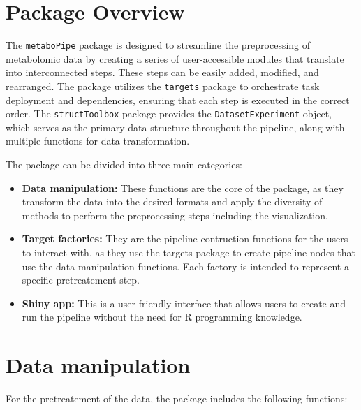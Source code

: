 \documentclass[ENG, BIB]{TFUOC}%
\begin{document}
\section{Package Overview}
The \texttt{metaboPipe} package is designed to streamline the preprocessing of metabolomic data by creating a series of user-accessible modules that translate into interconnected steps. These steps can be easily added, modified, and rearranged. The package utilizes the \texttt{targets} package to orchestrate task deployment and dependencies, ensuring that each step is executed in the correct order. The \texttt{structToolbox} package provides the \texttt{DatasetExperiment} object, which serves as the primary data structure throughout the pipeline, along with multiple functions for data transformation.

The package can be divided into three main categories:
\begin{itemize}
    \item \textbf{Data manipulation:} These functions are the core of the package, as they transform the data into the desired formats and apply the diversity of methods to perform the preprocessing steps including the visualization.
    \item \textbf{Target factories:} They are the pipeline contruction functions for the users to interact with, as they use the targets package to create pipeline nodes that use the data manipulation functions. Each factory is intended to represent a specific pretreatement step.
    \item \textbf{Shiny app:} This is a user-friendly interface that allows users to create and run the pipeline without the need for R programming knowledge.
\end{itemize}

\section{Data manipulation}
For the pretreatement of the data, the package includes the following functions:
\end{document}
